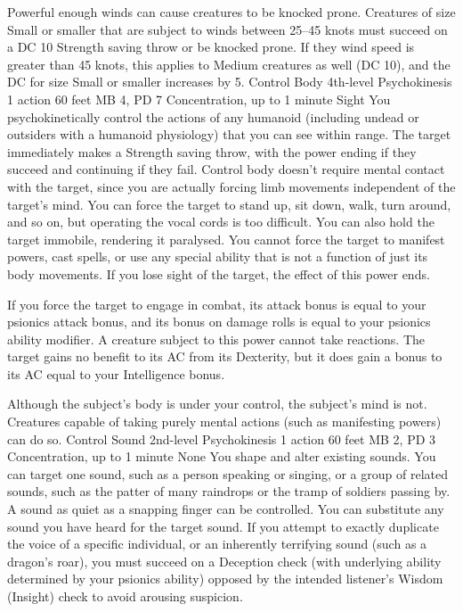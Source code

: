 Powerful enough winds can cause creatures to be knocked prone.
Creatures of size Small or smaller that are subject to winds
between 25--45 knots must succeed on a DC 10 Strength saving
throw or be knocked prone. If they wind speed is greater than
45 knots, this applies to Medium creatures as well (DC 10),
and the DC for size Small or smaller increases by 5.
\DndPowerHeader%
    {Control Body\label{pwr:control_body}}
    {4th-level Psychokinesis}
    {1 action}
    {60 feet}
    {MB 4, PD 7}
    {Concentration, up to 1 minute}
    {Sight}
You psychokinetically control the actions
of any humanoid (including undead or outsiders with a humanoid
physiology) that you can see within range. The target immediately
makes a Strength saving throw, with the power ending if they
succeed and continuing if they fail. Control body doesn't
require mental contact with the target, since you are actually
forcing limb movements independent of the target's mind.
You can force the target to stand up, sit down, walk, turn
around, and so on, but operating the vocal cords is too difficult.
You can also hold the target immobile, rendering it paralysed.
You cannot force the target to manifest powers, cast spells,
or use any special ability that is not a function of just
its body movements. If you lose sight of the target, the effect
of this power ends.

If you force the target to engage in combat, its attack bonus
is equal to your psionics attack bonus, and its bonus on damage
rolls is equal to your psionics ability modifier.
A creature subject to this power cannot take reactions.
The target gains no benefit to its AC from its Dexterity,
but it does gain a bonus to
its AC equal to your Intelligence bonus.

Although the subject's body is under your control, the subject's
mind is not. Creatures capable of taking purely mental actions
(such as manifesting powers) can do so.
\DndPowerHeader%
    {Control Sound\label{pwr:control_sound}}
    {2nd-level Psychokinesis}
    {1 action}
    {60 feet}
    {MB 2, PD 3}
    {Concentration, up to 1 minute}
    {None}
You shape and alter existing sounds. You
can target one sound, such as a person speaking or singing,
or a group of related sounds, such as the patter of many raindrops
or the tramp of soldiers passing by. A sound as quiet as a
snapping finger can be controlled. You can substitute any
sound you have heard for the target sound. If you attempt
to exactly duplicate the voice of a specific individual, or
an inherently terrifying sound (such as a dragon's roar),
you must succeed on a Deception check
(with underlying ability determined by your psionics ability)
opposed by the intended listener's Wisdom (Insight) check
to avoid arousing suspicion.

